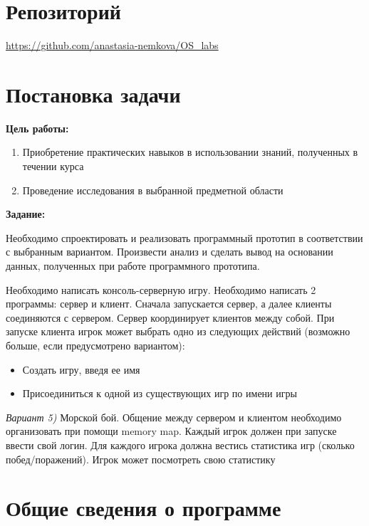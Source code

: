 \documentclass[a4paper, 14pt]{article}
\begin{document}
\section*{Репозиторий}   
\vspace{2ex}
\url{https://github.com/anastasia-nemkova/OS_labs}

\section*{Постановка задачи}   
\textbf{Цель работы:}
\vspace{2ex}
\begin{enumerate}
    \item Приобретение практических навыков в использовании знаний, полученных в течении курса
    \item Проведение исследования в выбранной предметной области
\end{enumerate}
\vspace{4ex}

\textbf{Задание:}
\vspace{2ex}

Необходимо спроектировать и реализовать программный прототип в соответствии с выбранным 
вариантом. Произвести анализ и сделать вывод на основании данных, полученных при работе 
программного прототипа.

Необходимо написать консоль-серверную игру. Необходимо написать 2 программы: сервер и клиент. Сначала запускается сервер, а далее клиенты соединяются с сервером. Сервер координирует клиентов между собой. При запуске клиента игрок может выбрать одно из следующих действий (возможно больше, если предусмотрено вариантом):
\begin{itemize}
    \item Создать игру, введя ее имя
    \item Присоединиться к одной из существующих игр по имени игры
\end{itemize}
\newline

\textit{Вариант 5)} Морской бой. Общение между сервером и клиентом необходимо организовать при 
помощи memory map. Каждый игрок должен при запуске ввести свой логин. Для каждого 
игрока должна вестись статистика игр (сколько побед/поражений). Игрок может 
посмотреть свою статистику 

\section*{Общие сведения о программе}
\end{document}
